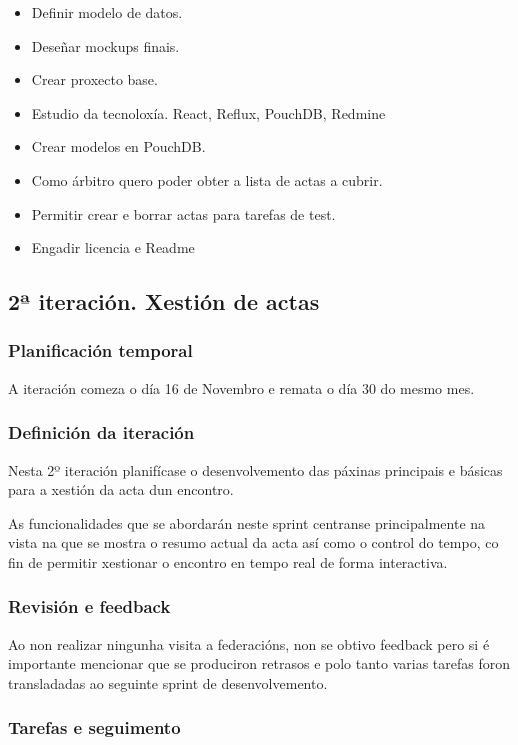         \begin{itemize}
         \item Definir modelo de datos.
         \item Deseñar mockups finais.
         \item Crear proxecto base.
         \item Estudio da tecnoloxía. React, Reflux, PouchDB, Redmine
         \item Crear modelos en PouchDB.
         \item Como árbitro quero poder obter a lista de actas a cubrir.
         \item Permitir crear e borrar actas para tarefas de test.
         \item Engadir licencia e Readme
        \end{itemize}


    \subsection{2ª iteración. Xestión de actas}

      \subsubsection{Planificación temporal}
      A iteración comeza o día 16 de Novembro e remata o día 30 do mesmo mes.

      \subsubsection{Definición da iteración}
        Nesta 2º iteración planifícase o desenvolvemento das páxinas principais 
e básicas para a xestión da acta dun encontro.

      As funcionalidades que se abordarán neste sprint centranse principalmente 
na vista na que se mostra o resumo actual da acta así como o control do tempo, 
co fin de permitir xestionar o encontro en tempo real de forma interactiva.

      \subsubsection{Revisión e feedback}
      Ao non realizar ningunha visita a federacións, non se obtivo feedback 
pero si é importante mencionar que se produciron retrasos e polo tanto varias 
tarefas foron transladadas ao seguinte sprint de desenvolvemento.

      \subsubsection{Tarefas e seguimento}

